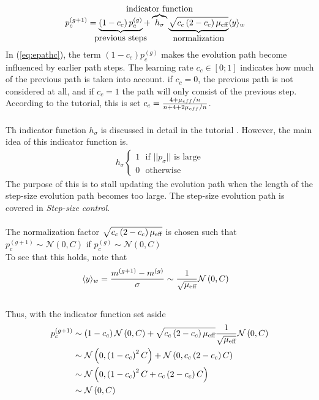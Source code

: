 \begin{align}
p_{c}^{(g+1)} &= \underbrace{\left( 1 - c_{c} \right) 
p_{c}^{(g)}}_{\makebox[0pt]{\text{previous steps}}}  + 
\overbrace{h_{\sigma}}^{\makebox[0pt]{\text{{indicator function}}}}
\underbrace{\sqrt{c_{c} \left( 2 - c_{c} \right) \offspringNumber_{\text{eff}}}}_{
\makebox[0pt]{\text{normalization}}
}
\langle y \rangle_{w} \label{eq:epathc}
\end{align}
In (\ref{eq:epathc}), the term $\left( 1 - c_{c} \right) p_{c}^{(g)}$ makes 
the evolution path become influenced by earlier path steps. The learning rate
$c_c \in [0;1] $ indicates how much of the previous path is taken into account.
if $c_c = 0$, the previous path is not considered at all, and if $c_c = 1$ the path 
will only consist of the previous step. According to the tutorial, this is set
$c_c = \frac{4 + \mu_{eff} / n}{n + 4 + 2 \mu_{eff} / n}$.\\
\\
Th indicator function $h_{\sigma}$ is discussed in detail in the tutorial \citep{hansen2011}.
However, the main idea of this indicator function is.
\begin{align}
h_{\sigma}
\begin{cases} 1\ \ \ \text{if $||p_{\sigma}||$ is large} \\
              0\ \ \ \text{otherwise} %
\end{cases}
\end{align}
The purpose of this is to stall updating the evolution path when 
the length of the step-size evolution path becomes too large. The step-size
evolution path is covered in \textit{Step-size control}.\\
\\
The normalization factor 
$\sqrt{c_{c} \left( 2 - c_{c} \right) \mu_{\text{eff}}}$ is chosen such that
$p^{(g+1)}_{c} \sim \mathcal{N}\left(0, C \right)$ if $p_c^{(g)} \sim \mathcal{N} 
\left(0, C\right)$\\
To see that this holds, note that
\begin{align}
\langle y \rangle_{w} &= \frac{m^{(g+1)} - m^{(g)}}{\sigma}
\sim \frac{1}{\sqrt{\mu_{\text{eff}}}}  \mathcal{N}\left(0, C \right)
\end{align}
\\
Thus, with the indicator function set aside
\begin{align}
p_{c}^{(g+1)} &\sim \left( 1 - c_{c} \right) 
\mathcal{N}\left(0, C \right) + 
\sqrt{c_{c} \left( 2 - c_{c} \right) \mu_{\text{eff}}}
\frac{1}{\sqrt{\mu_{\text{eff}}}}\mathcal{N}\left(0, C \right) \label{eq:nomalization_start}\\
&\sim
\mathcal{N}\left(0, \left( 1 - c_{c} \right)^2 C \right) + 
\mathcal{N}\left(0, c_{c} \left( 2 - c_{c} \right)  C \right)\\
&\sim
\mathcal{N}\left(0, \left( 1 - c_{c} \right)^2 C + c_{c} \left( 2 - c_{c} \right)  C  \right)\\
&\sim \mathcal{N}\left( 0, C \right) \label{eq:nomalization_end}
\end{align}
